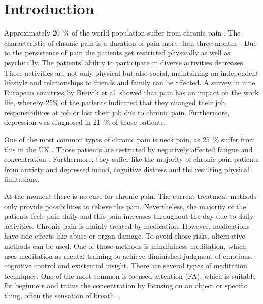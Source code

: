 \section{Introduction}
Approximately 20~\% of the world population suffer from chronic pain \cite{Macfarlanea2016}. The characteristic of chronic pain is a duration of pain more than three months \cite{Mello2016}. Due to the persistence of pain the patients get restricted physically as well as psychically. The patients’ ability to participate in diverse activities decreases. Those activities are not only physical but also social, maintaining an independent lifestyle and relationships to friends and family can be affected. A survey in nine European countries by Breivik et al. \cite{Breivik2006} showed that pain has an impact on the work life, whereby 25\% of the patients indicated that they changed their job, responsibilities at job or lost their job due to chronic pain. Furthermore, depression was diagnosed in 21~\% of those patients. \cite{Breivik2006} 

One of the most common types of chronic pain is neck pain, as 25~\% suffer from this in the UK \cite{Macfarlanea2016}. Those patients are restricted by negatively affected fatigue and concentration \cite{vanRanderaat2016}. Furthermore, they suffer like the majority of chronic pain patients from anxiety and depressed mood, cognitive distress and the resulting physical limitations. \cite{Gross2013} 

At the moment there is no cure for chronic pain. The current treatment methods only provide possibilities to relieve the pain. \cite{Pope2017,marcus2009} Nevertheless, the majority of the patients feels pain daily and this pain increases throughout the day due to daily activities. \cite{Breivik2006} 
Chronic pain is mainly treated by medication. However, medications have side effects like abuse or organ damage. To avoid those risks, alternative methods can be used. \cite{Pope2017,marcus2009, stein2017} One of those methods is mindfulness meditation, which uses meditation as mental training to achieve diminished judgment of emotions, cognitive control and existential insight. \cite{marcus2009} There are several types of meditation techniques. One of the most common is  focused attention (FA), which is suitable for beginners and trains the concentration by focusing on an object or specific thing, often the sensation of breath. \cite{Zeidan2016, Kabat1982}. 

